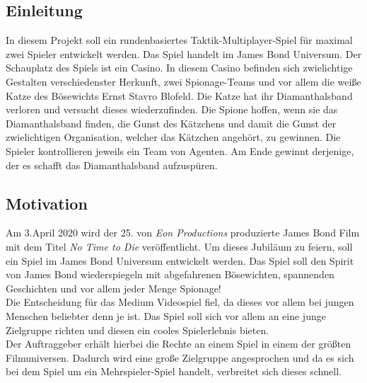 \subsection{Einleitung}
In diesem Projekt soll ein rundenbasiertes Taktik-Multiplayer-Spiel für maximal zwei Spieler entwickelt werden. Das Spiel handelt im James Bond Universum. 
Der Schauplatz des Spiels ist ein Casino. In diesem Casino befinden sich zwielichtige Gestalten verschiedenster Herkunft, zwei Spionage-Teams und vor allem die weiße Katze des Bösewichts Ernst Stavro Blofeld. Die Katze hat ihr Diamanthalsband verloren und versucht dieses wiederzufinden.
Die Spione hoffen, wenn sie das Diamanthalsband finden, die Gunst des Kätzchens und damit die Gunst der zwielichtigen Organisation, welcher das Kätzchen angehört, zu gewinnen.
Die Spieler kontrollieren jeweils ein Team von Agenten. Am Ende gewinnt derjenige, der es schafft das Diamanthalsband aufzuspüren.


\subsection{Motivation}
Am 3.April 2020 wird der 25. von \textit{Eon Productions} produzierte James Bond Film mit dem Titel \textit{No Time to Die} veröffentlicht. Um dieses Jubiläum zu feiern, soll ein Spiel im James Bond Universum entwickelt werden.
Das Spiel soll den Spirit von James Bond wiederspiegeln mit abgefahrenen Bösewichten, spannenden Geschichten und vor allem jeder Menge Spionage!\\
Die Entscheidung für das Medium Videospiel fiel, da dieses vor allem bei jungen Menschen beliebter denn je ist. Das Spiel soll sich vor allem an eine junge Zielgruppe richten und diesen ein cooles Spielerlebnis bieten.\\

Der Auftraggeber erhält hierbei die Rechte an einem Spiel in einem der größten Filmuniversen. Dadurch wird eine große Zielgruppe angesprochen und da es sich bei dem Spiel um ein Mehrspieler-Spiel handelt, verbreitet sich dieses schnell.


